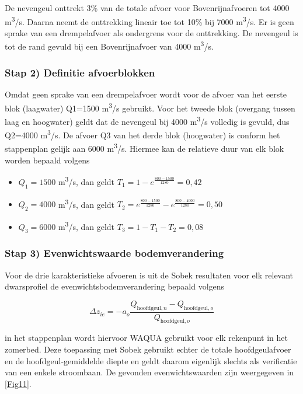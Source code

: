 De nevengeul onttrekt 3\% van de totale afvoer voor Bovenrijnafvoeren tot 4000 m\textsuperscript{3}/s.
Daarna neemt de onttrekking lineair toe tot 10\% bij 7000 m\textsuperscript{3}/s.
Er is geen sprake van een drempelafvoer als ondergrens voor de onttrekking.
De nevengeul is tot de rand gevuld bij een Bovenrijnafvoer van 4000 m\textsuperscript{3}/s.

\subsubsection*{Stap 2) Definitie afvoerblokken}

Omdat geen sprake van een drempelafvoer wordt voor de afvoer van het eerste blok (laagwater) Q1=1500 m\textsuperscript{3}/s gebruikt.
Voor het tweede blok (overgang tussen laag en hoogwater) geldt dat de nevengeul bij 4000 m\textsuperscript{3}/s volledig is gevuld, dus Q2=4000 m\textsuperscript{3}/s.
De afvoer Q3 van het derde blok (hoogwater) is conform het stappenplan gelijk aan 6000 m\textsuperscript{3}/s.
Hiermee kan de relatieve duur van elk blok worden bepaald volgens

\begin{itemize}
\item $Q_1=1500$ m\textsuperscript{3}/s, dan geldt $T_1 = 1-e^{\frac{800-1500}{1280}} = 0,42$
\item $Q_2=4000$ m\textsuperscript{3}/s, dan geldt $T_2 = e^{\frac{800-1500}{1280}} - e^{\frac{800-4000}{1280}} = 0,50$
\item $Q_3=6000$ m\textsuperscript{3}/s, dan geldt $T_3 = 1-T_1-T_2 = 0,08$
\end{itemize}

\subsubsection*{Stap 3) Evenwichtswaarde bodemverandering}

Voor de drie karakteristieke afvoeren is uit de Sobek resultaten voor elk relevant dwarsprofiel de evenwichtsbodemverandering bepaald volgens

\begin{equation}
\Delta z_{ie} = -a_o \frac{Q_{\text{hoofdgeul},n} - Q_{\text{hoofdgeul},o}}{Q_{\text{hoofdgeul},o}}
\end{equation}

\Note in het stappenplan wordt hiervoor WAQUA gebruikt voor elk rekenpunt in het zomerbed.
Deze toepassing met Sobek gebruikt echter de totale hoofdgeulafvoer en de hoofdgeul-gemiddelde diepte en geldt daarom eigenlijk slechts als verificatie van een enkele stroombaan.
De gevonden evenwichtswaarden zijn weergegeven in \autoref{Fig11}.

